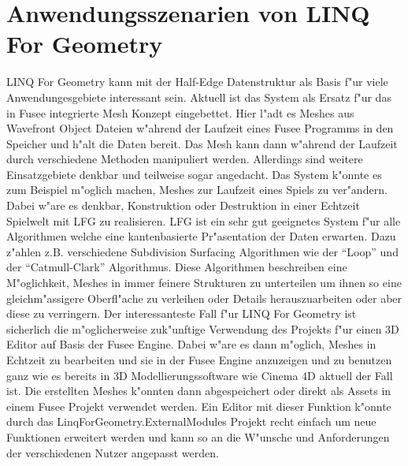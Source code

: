 \documentclass[pagesize, paper=a4, fontsize=12pt,titlepage=true, headings=small, headnosepline, abstractoff, liststotoc, nochapterprefix, plainheadsepline]{scrreprt}
\newcommand{\LFG}{LINQ For Geometry}
\newcommand{\LFGS}{LINQ For Geometry }
\newcommand{\HES}{Half-Edge Datenstruktur }
\begin{document}
	\section {Anwendungsszenarien von \LFG}
	\LFGS kann mit der \HES als Basis f"ur viele Anwendungesgebiete interessant sein. Aktuell ist das System als Ersatz f"ur das in Fusee integrierte Mesh Konzept eingebettet. Hier l"adt es Meshes aus Wavefront Object Dateien w"ahrend der Laufzeit eines Fusee Programms in den Speicher und h"alt die Daten bereit. Das Mesh kann dann w"ahrend der Laufzeit durch verschiedene Methoden manipuliert werden. Allerdings sind weitere Einsatzgebiete denkbar und teilweise sogar angedacht.
Das System k"onnte es zum Beispiel m"oglich machen, Meshes zur Laufzeit eines Spiels zu ver"andern. Dabei w"are es denkbar, Konstruktion oder Destruktion in einer Echtzeit Spielwelt mit LFG zu realisieren. LFG ist ein sehr gut geeignetes System f"ur alle Algorithmen welche eine kantenbasierte Pr"asentation der Daten erwarten. Dazu z"ahlen z.B. verschiedene Subdivision Surfacing Algorithmen wie der "`Loop"' und der "`Catmull-Clark"' Algorithmus. Diese Algorithmen beschreiben eine M"oglichkeit, Meshes in immer feinere Strukturen zu unterteilen um ihnen so eine gleichm"assigere Oberfl"ache zu verleihen oder Details herauszuarbeiten oder aber diese zu verringern.
Der interessanteste Fall f"ur \LFGS ist sicherlich die m"oglicherweise zuk"unftige Verwendung des Projekts f"ur einen 3D Editor auf Basis der Fusee Engine. Dabei w"are es dann m"oglich, Meshes in Echtzeit zu bearbeiten und sie in der Fusee Engine anzuzeigen und zu benutzen ganz wie es bereits in 3D Modellierungssoftware wie Cinema 4D aktuell der Fall ist. Die erstellten Meshes k"onnten dann abgespeichert oder direkt als Assets in einem Fusee Projekt verwendet werden. Ein Editor mit dieser Funktion k"onnte durch das LinqForGeometry.ExternalModules Projekt recht einfach um neue Funktionen erweitert werden und kann so an die W"unsche und Anforderungen der verschiedenen Nutzer angepasst werden.
\end{document}
